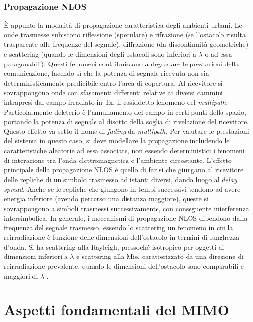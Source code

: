 \documentclass[technote]{IEEEtran}
\begin{document}
\subsubsection{Propagazione NLOS} È appunto la modalità  di propagazione caratteristica degli ambienti urbani. Le onde trasmesse subiscono riflessione (speculare) e rifrazione (se l'ostacolo risulta trasparente alle frequenze del segnale), diffrazione (da discontinuità  geometriche) e scattering (quando le dimensioni degli ostacoli sono inferiori a $\lambda$ o ad essa paragonabili). Questi fenomeni contribuiscono a degradare le prestazioni della comunicazione, facendo sì che la potenza di segnale ricevuta non sia deterministicamente predicibile entro l'area di copertura. Al ricevitore si sovrappongono onde con sfasamenti differenti relative ai diversi cammini intrapresi dal campo irradiato in Tx, il cosiddetto fenomeno del \textit{multipath}. Particolarmente deleterio è l'annullamento del campo in certi punti dello spazio, portando la potenza di segnale al disotto della soglia di rivelazione del ricevitore. Questo effetto va sotto il nome di \textit{fading} da \textit{multipath}. Per valutare le prestazioni del sistema in questo caso, si deve modellare la propagazione includendo le caratteristiche aleatorie ad essa associate, non essendo deterministici i fenomeni di interazione tra l'onda elettromagnetica e l'ambiente circostante. L'effetto principale della propagazione NLOS è quello di far sì che giungano al ricevitore delle repliche di un simbolo trasmesso ad istanti diversi, dando luogo al \textit{delay spread}. Anche se le repliche che giungono in tempi successivi tendono ad avere energia inferiore (avendo percorso una distanza maggiore), queste si sovrappongono a simboli trasmessi successivamente, con conseguente interferenza intersimbolica. In generale, i meccanismi di propagazione NLOS dipendono dalla frequenza del segnale trasmesso, essendo lo scattering un fenomeno in cui la reirradiazione è funzione delle dimensioni dell'ostacolo in termini di lunghezza d'onda. Si ha scattering alla Rayleigh, pressoché isotropico per oggetti di dimensioni inferiori a $\lambda$ e scattering alla Mie, caratterizzato da una direzione di reirradiazione prevalente, quando le dimensioni dell'ostacolo sono comparabili e maggiori di $\lambda$ \cite{Ishimaru}.




\section{Aspetti fondamentali del MIMO}
\end{document}
